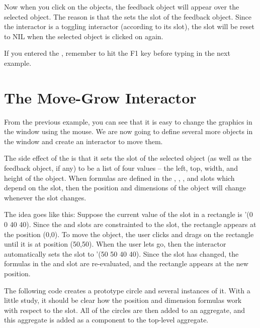 Now when you click on the objects, the feedback object will appear
over the selected object.  The reason is that the
 sets the  slot of the feedback
object.  Since the interactor is a toggling
interactor (according to its  slot), the 
slot will be reset to NIL when the selected object is clicked on again.

If you entered the , remember to hit the F1 key
before typing in the next example.


\section{The Move-Grow Interactor}

From the previous example, you can see that it is easy to change the
graphics in the window using the mouse.  We are now going to define several
more objects in the window and create an interactor to move them.

The side effect of the  is that it sets the
 slot of the selected object (as well as the feedback object,
if any) to be a list of four values -- the left, top, width, and
height of the object.  When formulas are defined in the ,
, , and  slots which depend on
the  slot, then the position and dimensions of the
object will change whenever the  slot changes.

The idea goes like this:  Suppose the current value of the 
slot in a rectangle is '(0 0 40 40).  Since the  and
 slots are constrainted to the  slot, the rectangle
appears at the position (0,0).  To move the object, the user clicks
and drags on the rectangle until it is at position (50,50).  When the
user lets go, then the interactor automatically sets the 
slot to '(50 50 40 40).  Since the  slot has changed, the
formulas in the  and  slot are re-evaluated, and
the rectangle appears at the new position.

The following code creates a prototype circle and several instances of
it.  With a little study, it should be clear how the position and dimension
formulas work with respect to the  slot.  All of the circles
are then added to an aggregate, and this aggregate is added as a
component to the top-level aggregate.

